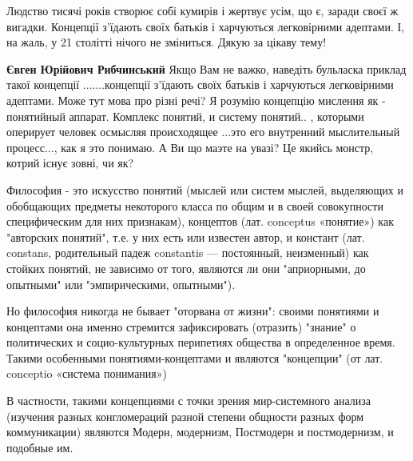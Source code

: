 \begin{itemize}
Людство тисячі років створює собі кумирів і жертвує усім, що є, заради своєї ж
вигадки. Концепції з’їдають своїх батьків і харчуються легковірними адептами.
І, на жаль, у 21 столітті нічого не зміниться. Дякую за цікаву тему!

\begin{itemize}
 
\textbf{Євген Юрійович Рибчинський} Якщо Вам не важко, наведіть бульласка
приклад такої концепції .......концепції з’їдають своїх батьків і харчуються
легковірними адептами. Може тут мова про різні речі? Я розумію концепцію
мислення як - понятийный аппарат. Комплекс понятий, и систему понятий.. ,
которыми оперирует человек осмысляя происходящее ...это его внутренний
мыслительный процесс..., как я это понимаю. А Ви що маэте на увазі? Це якийсь
монстр, котрий існує зовні, чи як?
\end{itemize}


Философия - это искусство понятий (мыслей или систем мыслей, выделяющих и
обобщающих предметы некоторого класса по общим и в своей совокупности
специфическим для них признакам), концептов (лат. conceptus «понятие») как
"авторских понятий", т.е. у них есть или известен автор, и констант (лат.
constans, родительный падеж constantis — постоянный, неизменный) как стойких
понятий, не зависимо от того, являются ли они "априорными, до опытными" или
"эмпирическими, опытными").

Но философия никогда не бывает "оторвана от жизни": своими понятиями и
концептами она именно стремится зафиксировать (отразить) "знание" о
политических и социо-культурных перипетиях общества в определенное время.
Такими особенными понятиями-концептами и являются "концепции" (от лат.
conceptio «система понимания»)

В частности, такими концепциями с точки зрения мир-системного анализа (изучения
разных конгломераций разной степени общности разных форм коммуникации) являются
Модерн, модернизм, Постмодерн и постмодернизм, и подобные им.

 


\end{itemize}
